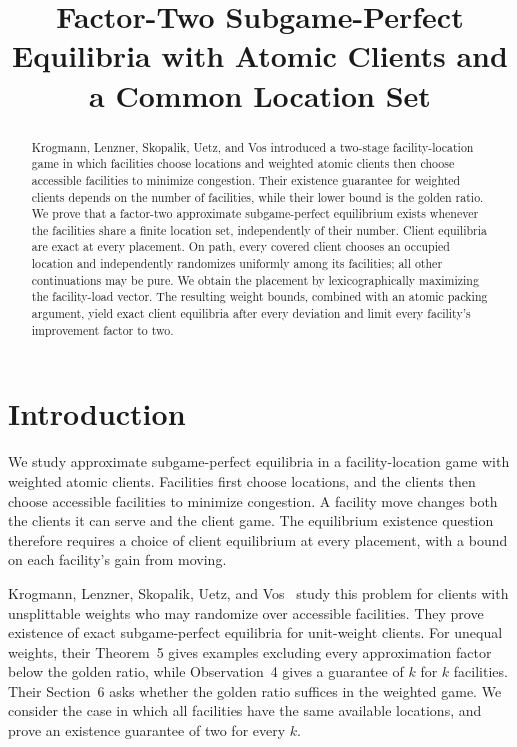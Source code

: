 \documentclass[11pt]{amsart}
\title[Factor-two equilibria with atomic clients]{Factor-Two Subgame-Perfect Equilibria with Atomic Clients and a Common Location Set}
\date{}
\theoremstyle{definition}
\begin{document}
\begin{abstract}
Krogmann, Lenzner, Skopalik, Uetz, and Vos introduced a two-stage facility-location game in which facilities choose locations and weighted atomic clients then choose accessible facilities to minimize congestion. Their existence guarantee for weighted clients depends on the number of facilities, while their lower bound is the golden ratio. We prove that a factor-two approximate subgame-perfect equilibrium exists whenever the facilities share a finite location set, independently of their number. Client equilibria are exact at every placement. On path, every covered client chooses an occupied location and independently randomizes uniformly among its facilities; all other continuations may be pure. We obtain the placement by lexicographically maximizing the facility-load vector. The resulting weight bounds, combined with an atomic packing argument, yield exact client equilibria after every deviation and limit every facility's improvement factor to two.
\end{abstract}
\maketitle

\section{Introduction}\label{sec:introduction}
We study approximate subgame-perfect equilibria in a facility-location game with weighted atomic clients. Facilities first choose locations, and the clients then choose accessible facilities to minimize congestion. A facility move changes both the clients it can serve and the client game. The equilibrium existence question therefore requires a choice of client equilibrium at every placement, with a bound on each facility's gain from moving.

Krogmann, Lenzner, Skopalik, Uetz, and Vos~\cite{krogmann2024} study this problem for clients with unsplittable weights who may randomize over accessible facilities. They prove existence of exact subgame-perfect equilibria for unit-weight clients. For unequal weights, their Theorem~5 gives examples excluding every approximation factor below the golden ratio, while Observation~4 gives a guarantee of $k$ for $k$ facilities. Their Section~6 asks whether the golden ratio suffices in the weighted game. We consider the case in which all facilities have the same available locations, and prove an existence guarantee of two for every $k$.
\end{document}
